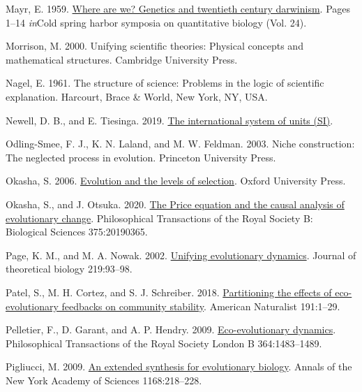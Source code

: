 \documentclass[
]{article}
\newlength{\cslhangindent}
\newenvironment{CSLReferences}[2] %
 {\begin{list}{}{%
  \setlength{\itemindent}{0pt}
  \setlength{\leftmargin}{0pt}
  \setlength{\parsep}{0pt}
  \ifodd #1
   \setlength{\leftmargin}{\cslhangindent}
   \setlength{\itemindent}{-1\cslhangindent}
  \fi
  \setlength{\itemsep}{#2\baselineskip}}}
 {\end{list}}
\begin{document}
\begin{CSLReferences}{0}{0}
Mayr, E. 1959. \href{https://doi.org/10.1101/SQB.1959.024.01.003}{Where
are we? Genetics and twentieth century darwinism}. Pages 1--14
\emph{in}Cold spring harbor symposia on quantitative biology (Vol. 24).

Morrison, M. 2000. Unifying scientific theories: Physical concepts and
mathematical structures. Cambridge University Press.

Nagel, E. 1961. The structure of science: Problems in the logic of
scientific explanation. Harcourt, Brace \& World, New York, NY, USA.

Newell, D. B., and E. Tiesinga. 2019.
\href{https://doi.org/10.6028/NIST.SP.330-2019}{The international system
of units (SI)}.

Odling-Smee, F. J., K. N. Laland, and M. W. Feldman. 2003. Niche
construction: The neglected process in evolution. Princeton University
Press.

Okasha, S. 2006.
\href{https://doi.org/10.1093/acprof:oso/9780199267972.001.0001}{Evolution
and the levels of selection}. Oxford University Press.

Okasha, S., and J. Otsuka. 2020.
\href{https://doi.org/10.1098/rstb.2019.0365}{{The Price equation and
the causal analysis of evolutionary change}}. Philosophical Transactions
of the Royal Society B: Biological Sciences 375:20190365.

Page, K. M., and M. A. Nowak. 2002.
\href{https://doi.org/10.1006/jtbi.2002.3112}{Unifying evolutionary
dynamics}. Journal of theoretical biology 219:93--98.

Patel, S., M. H. Cortez, and S. J. Schreiber. 2018.
\href{https://doi.org/10.1101/104505}{{Partitioning the effects of
eco-evolutionary feedbacks on community stability}}. American Naturalist
191:1--29.

Pelletier, F., D. Garant, and A. P. Hendry. 2009.
\href{https://doi.org/10.1098/rstb.2009.0027}{Eco-evolutionary
dynamics}. Philosophical Transactions of the Royal Society London B
364:1483--1489.

Pigliucci, M. 2009.
\href{https://doi.org/10.1111/j.1749-6632.2009.04578.x}{{An extended
synthesis for evolutionary biology}}. Annals of the New York Academy of
Sciences 1168:218--228.


\end{CSLReferences}
\end{document}
